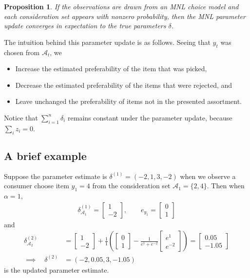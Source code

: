 \documentclass[preprint,12pt,authoryear]{elsarticle}
\newtheorem{proposition}{Proposition}
\begin{document}
\begin{proposition}If the observations are drawn from an MNL choice model and each consideration set appears with nonzero probability, then the MNL parameter update converges in expectation to the true parameters $\delta$.
\end{proposition}

The intuition behind this parameter update is as follows. Seeing that $y_t$ was chosen from $\mathcal{A}_t$, we 
\begin{itemize}
\item Increase the estimated preferability of the item that was picked,
\item Decrease the estimated preferability of the items that were rejected, and
\item Leave unchanged the preferability of items not in the presented assortment.
\end{itemize}
Notice that $\sum_{i=1}^n \delta_i$ remains constant under the parameter update, because $\sum_i z_i = 0$. 

\subsection{A brief example}
Suppose the parameter estimate is $\delta^{(1)} = (-2, 1, 3, -2)$ when we observe a consumer choose item $y_1 = 4$ from the consideration set  $\mathcal{A}_1 = \{2, 4\}$. Then when $\alpha = 1$, 
\begin{align}
\delta_{\mathcal{A}_1}^{(1)} =  \begin{bmatrix}1\\ -2\end{bmatrix}, \qquad e_{y_1} = \begin{bmatrix}0\\1\end{bmatrix} 
\end{align}
and
\begin{align}
\delta_{\mathcal{A}_2}^{(2)} &= \begin{bmatrix}1\\ -2\end{bmatrix} +
\frac{1}{1}\left(\begin{bmatrix}0\\ 1\end{bmatrix} - \frac{1}{e^1 + e^{-2}}\begin{bmatrix}e^1\\ e^{-2}\end{bmatrix}\right) =
\begin{bmatrix}0.05 \\ -1.05 \end{bmatrix} \\
\implies \quad \delta^{(2)} &= (-2, 0.05, 3, -1.05)
\end{align}
is the updated parameter estimate.
\end{document}
